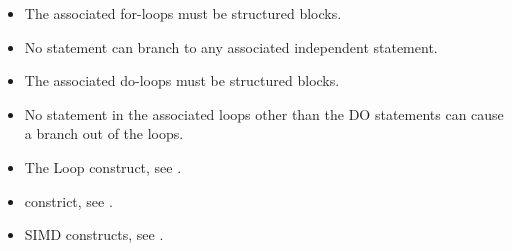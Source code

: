 \begin{ccppspecific}
\begin{itemize}
    
  \item The associated for-loops must be structured blocks.

  \item No statement can branch to any associated independent statement.

\end{itemize}

\end{ccppspecific}

\begin{fortranspecific}
\begin{itemize}
    
  \item The associated do-loops must be structured blocks.
    
  \item No statement in the associated loops other than the DO statements can cause
    a branch out of the loops.


\end{itemize}
\end{fortranspecific}

\crossreferences
\begin{itemize}
  \item The Loop construct, see .

  \item {} constrict, see .

  \item SIMD constructs, see .


\end{itemize}
